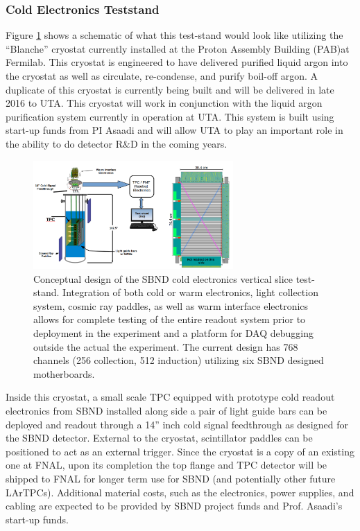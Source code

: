 \subsubsection{Cold Electronics Teststand}\label{sec:SBNDTeststand}
Figure \ref{fig:teststand} shows a schematic of what this test-stand would look like utilizing the ``Blanche'' cryostat currently installed at the Proton Assembly Building (PAB)at Fermilab. This cryostat is engineered to have delivered purified liquid argon into the cryostat as well as circulate, re-condense, and purify boil-off argon. A duplicate of this cryostat is currently being built and will be delivered in late 2016 to UTA. This cryostat will work in conjunction with the liquid argon purification system currently in operation at UTA. This system is built using start-up funds from PI Asaadi and will allow UTA to play an important role in the ability to do detector R$\&$D in the coming years. 

\begin{figure}[htb]
\centering
\includegraphics[width=0.68\textwidth]{images/teststand3.png}
\caption[]{Conceptual design of the SBND cold electronics vertical slice test-stand. Integration of both cold or warm electronics, light collection system, cosmic ray paddles, as well as warm interface electronics allows for complete testing of the entire readout system prior to deployment in the experiment and a platform for DAQ debugging outside the actual the experiment. The current design has 768 channels (256 collection, 512 induction) utilizing six SBND designed motherboards.}
\label{fig:teststand}
\end{figure} 

Inside this cryostat, a small scale TPC equipped with prototype cold readout electronics from SBND installed along side a pair of light guide bars can be deployed and readout through a 14'' inch cold signal feedthrough as designed for the SBND detector. External to the cryostat, scintillator paddles can be positioned to act as an external trigger. Since the cryostat is a copy of an existing one at FNAL, upon its completion the top flange and TPC detector will be shipped to FNAL for longer term use for SBND (and potentially other future LArTPCs). Additional material costs, such as the electronics, power supplies, and cabling are expected to be provided by SBND project funds and Prof. Asaadi's start-up funds.

